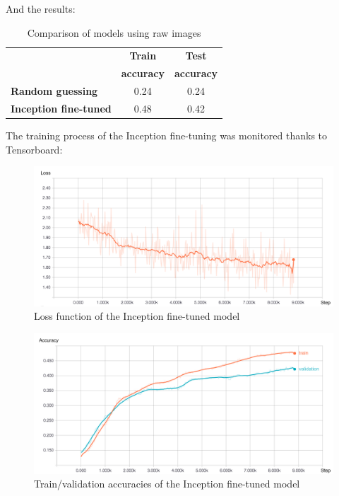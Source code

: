 And the results:
\begin{table}[H]
\begin{center}
    \begin{tabular}{| l | c | c |}
    \hline
    & \textbf{Train} & \textbf{Test} \\
    & \textbf{accuracy} & \textbf{accuracy} \\ \hline
    \textbf{Random guessing} & 0.24 & 0.24 \\ \hline
    \textbf{Inception fine-tuned}  & 0.48 & 0.42 \\
    \hline
    \end{tabular}
\end{center} 
\caption{Comparison of models using raw images}
\end{table}

The training process of the Inception fine-tuning was monitored thanks to Tensorboard:
\begin{figure}[H]
    \centering
    \includegraphics[width=\textwidth]{Images/image_model_loss_cleaned.jpg}
    \caption{Loss function of the Inception fine-tuned model}
\end{figure}

\begin{figure}[H]
    \centering
    \includegraphics[width=\textwidth]{Images/image_model_accuracies_cleaned.jpg}
    \caption{Train/validation accuracies of the Inception fine-tuned model}
\end{figure}

